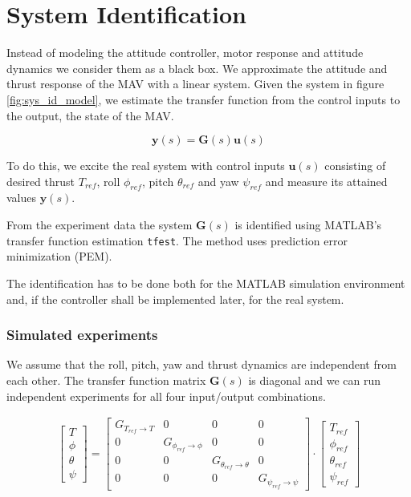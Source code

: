 \section{System Identification}
\label{sec:sys_id}
Instead of modeling the attitude controller, motor response and attitude dynamics we consider them as a black box. We approximate the attitude and thrust response of the MAV with a linear system. Given the system in figure \ref{fig:sys_id_model}, we estimate the transfer function from the control inputs to the output, the state of the MAV.

\begin{equation}
\mathbf{y}(s) = \mathbf{G}(s) \mathbf{u}(s)
\end{equation}

To do this, we excite the real system with control inputs $\mathbf{u}(s)$ consisting of desired thrust $T_{ref}$, roll $\phi_{ref}$, pitch $\theta_{ref}$ and yaw $\psi_{ref}$ and measure its attained values $\mathbf{y}(s)$.

From the experiment data the system $\mathbf{G}(s)$ is identified using MATLAB's transfer function estimation \texttt{tfest}. The method uses prediction error minimization (PEM).

The identification has to be done both for the MATLAB simulation environment and, if the controller shall be implemented later, for the real system.

\subsubsection{Simulated experiments}
We assume that the roll, pitch, yaw and thrust dynamics are independent from each other. The transfer function matrix $\mathbf{G}(s)$ is diagonal and we can run independent experiments for all four input/output combinations.

\begin{align}
\begin{bmatrix}
T \\ \phi \\ \theta \\ \psi
\end{bmatrix}
=
\begin{bmatrix}
G_{T_{ref} \rightarrow T} & 0 & 0 & 0 \\ 
0 & G_{\phi_{ref} \rightarrow \phi} & 0 & 0 \\ 
0 & 0 & G_{\theta_{ref} \rightarrow \theta} & 0 \\ 
0 & 0 & 0 & G_{\psi_{ref} \rightarrow \psi}  
\end{bmatrix}
\cdot
\begin{bmatrix}
T_{ref} \\ \phi_{ref} \\ \theta_{ref} \\ \psi_{ref}
\end{bmatrix}
\end{align}

